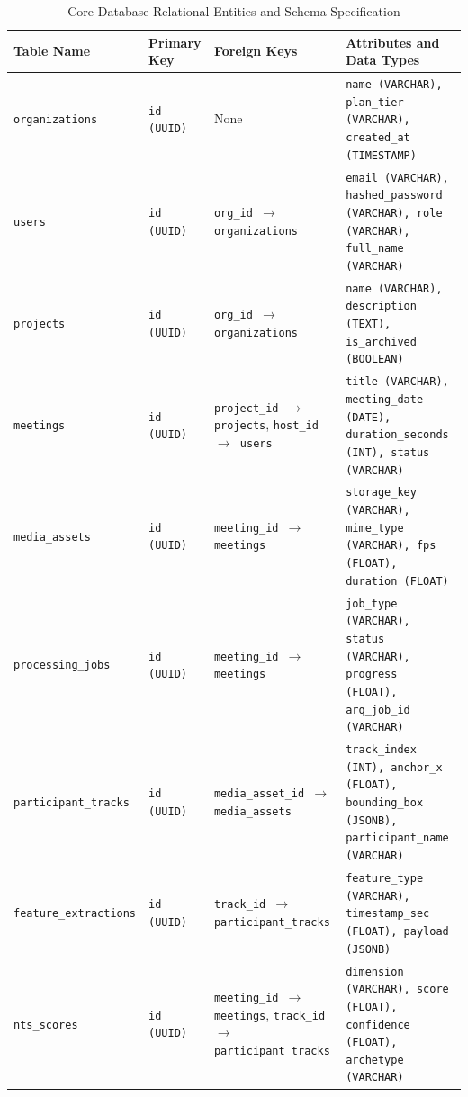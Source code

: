 \documentclass[12pt,a4paper,oneside]{report}
\begin{document}
\begin{table}[htbp]
\centering
\caption{Core Database Relational Entities and Schema Specification}
\label{tab:database_schema}
\fontsize{8.5}{10.5}\selectfont
\begin{tabularx}{\textwidth}{@{}l l l X@{}}
\toprule
\textbf{Table Name} & \textbf{Primary Key} & \textbf{Foreign Keys} & \textbf{Attributes and Data Types} \\
\midrule
\texttt{organizations} & \texttt{id (UUID)} & None & \texttt{name (VARCHAR), plan\_tier (VARCHAR), created\_at (TIMESTAMP)} \\
\addlinespace
\texttt{users} & \texttt{id (UUID)} & \texttt{org\_id $\rightarrow$ organizations} & \texttt{email (VARCHAR), hashed\_password (VARCHAR), role (VARCHAR), full\_name (VARCHAR)} \\
\addlinespace
\texttt{projects} & \texttt{id (UUID)} & \texttt{org\_id $\rightarrow$ organizations} & \texttt{name (VARCHAR), description (TEXT), is\_archived (BOOLEAN)} \\
\addlinespace
\texttt{meetings} & \texttt{id (UUID)} & \texttt{project\_id $\rightarrow$ projects}, \newline \texttt{host\_id $\rightarrow$ users} & \texttt{title (VARCHAR), meeting\_date (DATE), duration\_seconds (INT), status (VARCHAR)} \\
\addlinespace
\texttt{media\_assets} & \texttt{id (UUID)} & \texttt{meeting\_id $\rightarrow$ meetings} & \texttt{storage\_key (VARCHAR), mime\_type (VARCHAR), fps (FLOAT), duration (FLOAT)} \\
\addlinespace
\texttt{processing\_jobs} & \texttt{id (UUID)} & \texttt{meeting\_id $\rightarrow$ meetings} & \texttt{job\_type (VARCHAR), status (VARCHAR), progress (FLOAT), arq\_job\_id (VARCHAR)} \\
\addlinespace
\texttt{participant\_tracks} & \texttt{id (UUID)} & \texttt{media\_asset\_id $\rightarrow$ media\_assets} & \texttt{track\_index (INT), anchor\_x (FLOAT), bounding\_box (JSONB), participant\_name (VARCHAR)} \\
\addlinespace
\texttt{feature\_extractions} & \texttt{id (UUID)} & \texttt{track\_id $\rightarrow$ participant\_tracks} & \texttt{feature\_type (VARCHAR), timestamp\_sec (FLOAT), payload (JSONB)} \\
\addlinespace
\texttt{nts\_scores} & \texttt{id (UUID)} & \texttt{meeting\_id $\rightarrow$ meetings}, \newline \texttt{track\_id $\rightarrow$ participant\_tracks} & \texttt{dimension (VARCHAR), score (FLOAT), confidence (FLOAT), archetype (VARCHAR)} \\
\bottomrule
\end{tabularx}
\end{table}
\end{document}
